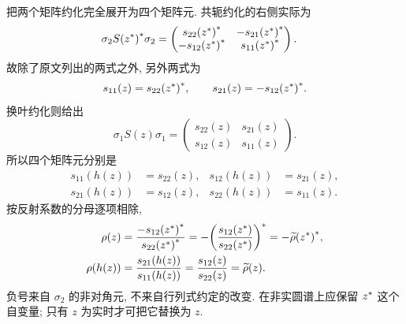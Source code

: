 \par\medskip\noindent 把两个矩阵约化完全展开为四个矩阵元.\quad
共轭约化的右侧实际为
\begin{align*}
\sigma_2{S({z}^{*})}^{*}\sigma_2
&=\begin{pmatrix}
{s_{22}({z}^{*})}^{*}&-{s_{21}({z}^{*})}^{*}\\
-{s_{12}({z}^{*})}^{*}&{s_{11}({z}^{*})}^{*}
\end{pmatrix}.
\end{align*}
故除了原文列出的两式之外, 另外两式为
\begin{equation*}
s_{11}(z)={s_{22}({z}^{*})}^{*},
\qquad
s_{21}(z)=-{s_{12}({z}^{*})}^{*}.
\end{equation*}
换叶约化则给出
\begin{equation*}
\sigma_1S(z)\sigma_1
=\begin{pmatrix}s_{22}(z)&s_{21}(z)\\s_{12}(z)&s_{11}(z)\end{pmatrix}.
\end{equation*}
所以四个矩阵元分别是
\begin{align*}
s_{11}(h(z))&=s_{22}(z),&s_{12}(h(z))&=s_{21}(z),\\
s_{21}(h(z))&=s_{12}(z),&s_{22}(h(z))&=s_{11}(z).
\end{align*}
按反射系数的分母逐项相除,
\begin{align*}
\rho(z)
&=\dfrac{-{s_{12}({z}^{*})}^{*}}{{s_{22}({z}^{*})}^{*}}
=-{\left(\dfrac{s_{12}({z}^{*})}{s_{22}({z}^{*})}\right)}^{*}
=-{\widetilde\rho({z}^{*})}^{*},\\
\rho(h(z))
&=\dfrac{s_{21}(h(z))}{s_{11}(h(z))}
=\dfrac{s_{12}(z)}{s_{22}(z)}=\widetilde\rho(z).
\end{align*}
负号来自 $\sigma_2$ 的非对角元, 不来自行列式约定的改变.
在非实圆谱上应保留 ${z}^{*}$ 这个自变量;
只有 $z$ 为实时才可把它替换为 $z$.




